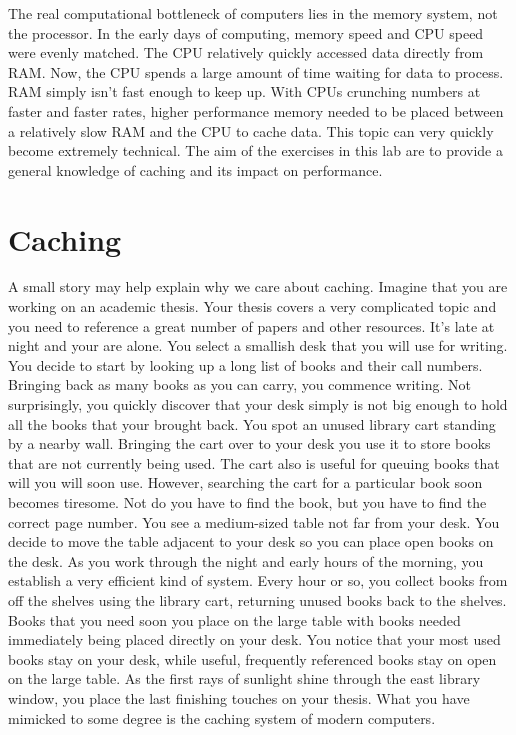 
The real computational bottleneck of computers lies in the memory system, not the processor.  
In the early days of computing, memory speed and CPU speed were evenly matched.  
The CPU relatively quickly accessed data directly from RAM.  
Now, the CPU spends a large amount of time waiting for data to process.  
RAM simply isn't fast enough to keep up.  With CPUs crunching numbers at faster and faster rates, higher performance memory needed to be placed between a relatively slow RAM and the CPU to cache data.
This topic can very quickly become extremely technical. 
The aim of the exercises in this lab are to provide a general knowledge of caching and its impact on performance.


\section*{Caching}
A small story may help explain why we care about caching.
Imagine that you are working on an academic thesis.  
Your thesis covers a very complicated topic and you need to reference a great number of papers and other resources.
It's late at night and your are alone.
You select a smallish desk that you will use for writing.
You decide to start by looking up a long list of books and their call numbers.  Bringing back as many books as you can carry, you commence writing.
Not surprisingly, you quickly discover that your desk simply is not big enough to hold all the books that your brought back.
You spot an unused library cart standing by a nearby wall.
Bringing the cart over to your desk you use it to store books that are not currently being used.
The cart also is useful for queuing books that will you will soon use.
However, searching the cart for a particular book soon becomes tiresome.  
Not do you have to find the book, but you have to find the correct page number.
You see a medium-sized table not far from your desk.
You decide to move the table adjacent to your desk so you can place open books on the desk.
As you work through the night and early hours of the morning, you establish a very efficient kind of system.
Every hour or so, you collect books from off the shelves using the library cart, returning unused books back to the shelves.
Books that you need soon you place on the large table with books needed immediately being placed directly on your desk.
You notice that your most used books stay on your desk, while useful, frequently referenced books stay on open on the large table.
As the first rays of sunlight shine through the east library window, you place the last finishing touches on your thesis.
What you have mimicked to some degree is the caching system of modern computers.

